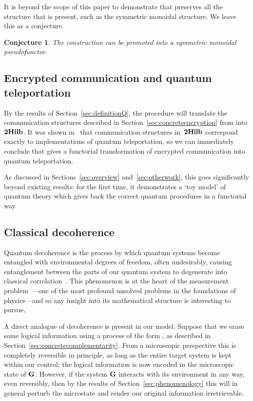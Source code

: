 \documentclass[a4paper,12pt]{article}
\newtheorem{conjecture}[theorem]{Conjecture}
\theoremstyle{definition}
\newcommand\cat[1]{{\ensuremath{\bf #1}}}
\renewcommand{\-}[0]{\nobreakdash-\hspace{0pt}}
\begin{document}
It is beyond the scope of this paper to demonstrate that  preserves all the structure that is present, such as the symmetric monoidal structure. We leave this as a conjecture.
\begin{conjecture} The construction  can be promoted into a symmetric monoidal pseudofunctor.
\end{conjecture}

\subsection{Encrypted communication and quantum teleportation}
\label{sec:teleportation}

\noindent
By the results of Section~\ref{sec:definitionQ}, the procedure  will translate the communication structures described in Section~\ref{sec:concreteencryption} from  into \cat{2Hilb}. It was shown in~\cite{v12-hqt, v12-hsqp} that communication structures in~\cat{2Hilb} correspond exactly to implementations of quantum teleportation, so we can immediately conclude that  gives a functorial transformation of encrypted communication into quantum teleportation.

As discussed in Sections~\ref{sec:overview} and~\ref{sec:otherwork}, this goes significantly beyond existing results: for the first time, it demonstrates a `toy model' of quantum theory which  gives back the correct quantum procedures in a functorial way.

\subsection{Classical decoherence}
\label{sec:decoherence}

\noindent
Quantum decoherence is the process by which quantum systems become entangled with environmental degrees of freedom, often undesirably, causing entanglement between the parts of our quantum system to degenerate into classical correlation~\cite{decoherence}. This phenomenon is at the heart of the measurement problem~\cite{s05-decoherence}---one of the most profound unsolved problems in the foundations of physics---and so any insight into its mathematical structure is interesting to pursue.

A direct analogue of decoherence is present in our model. Suppose that we erase some logical information using a process of the form , as described in Section~\ref{sec:concretecomplementarity}. From a microscopic perspective this is completely reversible in principle, as long as the entire target system  is kept within our control; the logical information is now encoded in the microscopic state of \cat G. However, if the system \cat G interacts with its environment in any way, even reversibly, then by the results of Section~\ref{sec:phenomenology} this will in general perturb the microstate and render our original information irretrievable.
\end{document}
